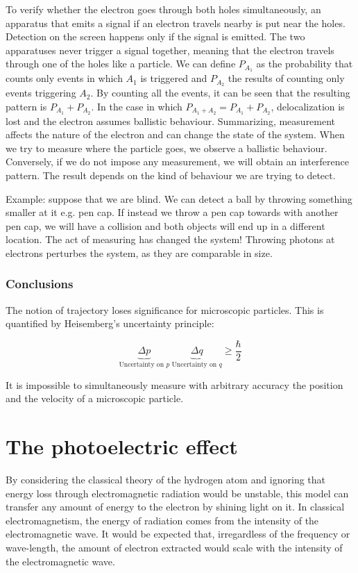    
    
    To verify whether the electron goes through both holes simultaneously, an apparatus that emits a signal if an electron travels nearby is put near the holes.
    Detection on the screen happens only if the signal is emitted.
    The two apparatuses never trigger a signal together, meaning that the electron travels through one of the holes like a particle.
    We can define $P_{A_1}$ as the probability that counts only events in which $A_1$ is triggered and $P_{A_2}$ the results of counting only events triggering $A_2$.
    By counting all the events, it can be seen that the resulting pattern is $P_{A_1}+P_{A_2}$.
    In the case in which $P_{A_1+A_2} = P_{A_1} + P_{A_2}$, delocalization is lost and the electron assumes ballistic behaviour.
    Summarizing, measurement affects the nature of the electron and can change the state of the system.
When we try to measure where the particle goes, we observe a ballistic behaviour. Conversely, if we do not impose any measurement, we will obtain an interference pattern. The result depends on the kind of behaviour we are trying to detect. 

Example: suppose that we are blind. We can detect a ball by throwing something smaller at it e.g. pen cap. If instead we throw a pen cap towards with another pen cap, we will have a collision and both objects will end up in a different location. The act of measuring has changed the system! 
Throwing photons at electrons perturbes the system, as they are comparable in size.

    \subsubsection{Conclusions}
    The notion of trajectory loses significance for microscopic particles.
    This is quantified by Heisemberg's uncertainty principle:

    $$\underbrace{\Delta p}_{\text{Uncertainty on }p}\ \underbrace{\Delta q }_{\text{Uncertainty on }q} \ge \frac{\hbar}{2}$$

    It is impossible to simultaneously measure with arbitrary accuracy the position and the velocity of a microscopic particle.

\section{The photoelectric effect}
By considering the classical theory of the hydrogen atom and ignoring that energy loss through electromagnetic radiation would be unstable, this model can transfer any amount of energy to the electron by shining light on it.
In classical electromagnetism, the energy of radiation comes from the intensity of the electromagnetic wave.
It would be expected that, irregardless of the frequency or wave-length, the amount of electron extracted would scale with the intensity of the electromagnetic wave.

